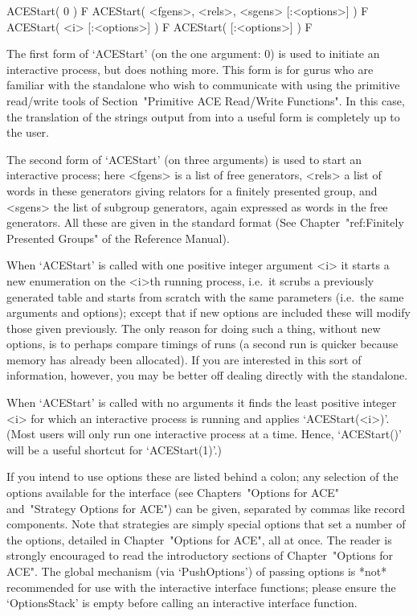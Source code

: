 
\beginitems

\>ACEStart( 0 ) F
\>ACEStart( <fgens>, <rels>, <sgens> [:<options>] ) F
\>ACEStart( <i> [:<options>] ) F
\>ACEStart( [:<options>] ) F

The first form of `ACEStart' (on the  one  argument:  0)  is  used  to
initiate an interactive {\ACE} process, but does  nothing  more.  This
form is for gurus who are familiar with the {\ACE} standalone who wish
to communicate with {\ACE} using the  primitive  read/write  tools  of
Section~"Primitive  ACE  Read/Write  Functions".  In  this  case,  the
translation of the strings output from {\ACE}  into  a  useful  {\GAP}
form is completely up to the user.

The second form of `ACEStart' (on three arguments) is used to start an
interactive process; here <fgens> is a list of free generators, <rels>
a list of words in these generators giving  relators  for  a  finitely
presented group, and <sgens> the list of  subgroup  generators,  again
expressed as words in the free generators. All these are given in  the
standard {\GAP} format (See Chapter~"ref:Finitely Presented Groups" of
the {\GAP} Reference Manual).

When `ACEStart' is called with one positive integer  argument  <i>  it
starts a new enumeration on the <i>th running process, i.e.~it  scrubs
a previously generated table and starts from  scratch  with  the  same
parameters (i.e.~the same arguments and options); except that  if  new
options are included these will modify  those  given  previously.  The
only reason for doing such a thing, without new options, is to perhaps
compare timings of runs (a second run is quicker  because  memory  has
already been allocated).  If  you  are  interested  in  this  sort  of
information, however, you may be better off dealing directly with  the
standalone.

When `ACEStart' is  called  with  no  arguments  it  finds  the  least
positive integer <i> for which an interactive process is  running  and
applies `ACEStart(<i>)'. (Most users will  only  run  one  interactive
process at a time. Hence, `ACEStart()' will be a useful  shortcut  for
`ACEStart(1)'.)

If you intend to use options these are  listed  behind  a  colon;  any
selection  of  the  options   available   for   the   interface   (see
Chapters~"Options for ACE" and~"Strategy  Options  for  ACE")  can  be
given,  separated  by  commas  like  record  components.   Note   that
strategies are simply  special  options  that  set  a  number  of  the
options, detailed in Chapter~"Options  for  ACE",  all  at  once.  The
reader is strongly encouraged to read  the  introductory  sections  of
Chapter~"Options for ACE". The global mechanism (via `PushOptions') of
passing options is *not* recommended  for  use  with  the  interactive
{\ACE} interface functions; please ensure the `OptionsStack' is  empty
before calling an interactive {\ACE} interface function.

